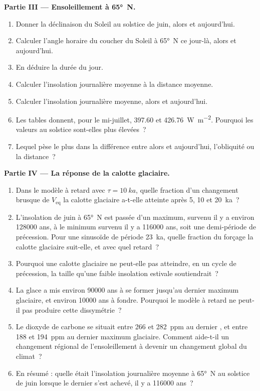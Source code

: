 \begin{problem}
\medskip\noindent\textbf{Partie III --- Ensoleillement à \ang{65}~N.}
\begin{enumerate}[resume]
  \item Donner la déclinaison du Soleil au solstice de juin, alors et aujourd'hui.
  \item Calculer l'angle horaire du coucher du Soleil à \ang{65}~N ce jour-là, alors et aujourd'hui.
  \item En déduire la durée du jour.
  \item Calculer l'insolation journalière moyenne à la distance moyenne.
  \item Calculer l'insolation journalière moyenne, alors et aujourd'hui.
  \item Les tables donnent, pour le mi-juillet, 397.60 et \qty{426.76}{W.m^{-2}}. Pourquoi les valeurs
        au solstice sont-elles plus élevées~?
  \item Lequel pèse le plus dans la différence entre alors et aujourd'hui, l'obliquité ou la distance~?
\end{enumerate}

\medskip\noindent\textbf{Partie IV --- La réponse de la calotte glaciaire.}
\begin{enumerate}[resume]
  \item Dans le modèle à retard avec $\tau = \qty{10}{ka}$, quelle fraction d'un changement brusque de
        $V_{\mathrm{eq}}$ la calotte glaciaire a-t-elle atteinte après 5, 10 et \qty{20}{ka}~?
  \item L'insolation de juin à \ang{65}~N est passée d'un maximum, survenu il y a environ \num{128000} ans, à
        le minimum survenu il y a \num{116000} ans, soit une demi-période de précession. Pour une sinusoïde de période
        \qty{23}{ka}, quelle fraction du forçage la calotte glaciaire suit-elle, et avec quel retard~?
  \item Pourquoi une calotte glaciaire ne peut-elle pas atteindre, en un cycle de précession, la taille qu'une faible
        insolation estivale soutiendrait~?
  \item La glace a mis environ \num{90000} ans à se former jusqu'au dernier maximum glaciaire, et environ
        \num{10000} ans à fondre. Pourquoi le modèle à retard ne peut-il pas produire cette dissymétrie~?
  \item Le dioxyde de carbone se situait entre 266 et \qty{282}{ppm} au dernier , et entre
        188 et \qty{194}{ppm} au dernier maximum glaciaire. Comment aide-t-il un changement régional de
        l'ensoleillement à devenir un changement global du climat~?
  \item En résumé : quelle était l'insolation journalière moyenne à \ang{65}~N au solstice de juin lorsque le dernier 
        s'est achevé, il y a \num{116000} ans~?
\end{enumerate}
\end{problem}

